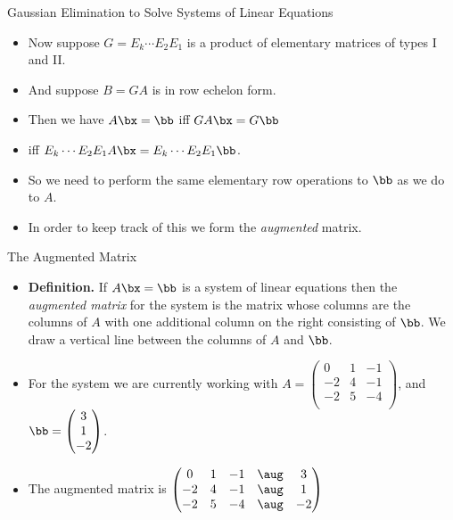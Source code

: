 \documentclass{beamer}
\begin{document}

\begin{frame}{Gaussian Elimination to Solve Systems of Linear Equations}

\begin{itemize}
\item Now suppose $G = E_k \cdots E_2 E_1$ is a product of elementary matrices of types I and II.
\item And suppose $B = G A$ is in row echelon form.
\item Then we have $A\bx=\bb$ iff $GA\bx = G\bb$
\item iff $E_k \cdots E_2 E_1 A \bx = E_k \cdots E_2 E_1 \bb$.
\item So we need to perform the same elementary row operations to $\bb$ as we do to
$A$.
\item In order to keep track of this we form the \emph{augmented} matrix.
\end{itemize}
\end{frame}


\begin{frame}{The Augmented Matrix}

\begin{itemize}
\item \textbf{Definition.} If $A\bx=\bb$ is a system of linear equations then the
\emph{augmented matrix} for the system is the matrix whose columns are the columns
of $A$ with one additional column on the right consisting of $\bb$. We draw
a vertical line between the columns of $A$ and $\bb$.
\item For the system we are currently working with
$A=
\begin{pmatrix}
 0 & 1 & -1 \\
-2 & 4 & -1 \\
-2 & 5 & -4 \\
\end{pmatrix}
$,
and
$
\bb =
\begin{pmatrix}
3 \\ 1 \\ -2
\end{pmatrix}
$.
\item The augmented matrix is
$
\begin{pmatrix}
 0 & 1 & -1  &  \aug & 3  \\
-2 & 4 & -1  &  \aug & 1  \\
-2 & 5 & -4  &  \aug & -2  \\
\end{pmatrix}
$
\end{itemize}
\end{frame}
\end{document}
